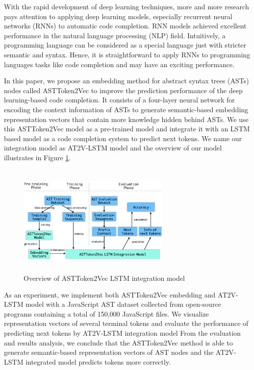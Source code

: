 \documentclass[T, E]{compsoft}
\begin{document}
With the rapid development of deep learning techniques, more and more research pays attention to applying deep learning models, especially recurrent neural networks (RNNs) to automatic code completion. 
RNN models achieved excellent performance in the natural language processing (NLP) field. 
Intuitively, a programming language can be considered as a special language just with stricter semantic and syntax. 
Hence, it is straightforward to apply RNNs to programming languages tasks like code completion and may have an exciting performance.

In this paper, we propose an embedding method for abstract syntax trees (ASTs) nodes called ASTToken2Vec to improve the prediction performance of the deep learning-based code completion. 
It consists of a four-layer neural network for encoding the context information of ASTs to generate semantic-based embedding representation vectors that contain more knowledge hidden behind ASTs. 
We use this ASTToken2Vec model as a pre-trained model and integrate it with an LSTM based model as a code completion system to predict next tokens. 
We name our integration model as AT2V-LSTM model and the overview of our model illustrates in Figure \ref{fig:overivew_model}.

\begin{figure}[!ht]
\centering
\includegraphics[width=7.5cm, height=5.5cm]{pictures/model_overview.png}
\caption{Overview of ASTToken2Vec LSTM integration model}
\label{fig:overivew_model}
\end{figure}

As an experiment, we implement both ASTToken2Vec embedding and AT2V-LSTM model with a JavaScript AST dataset\Cite{dataset} collected from open-source programs containing a total of 150,000 JavaScript files. 
We visualize representation vectors of several terminal tokens and evaluate the performance of predicting next tokens by AT2V-LSTM integration model
From the evaluation and results analysis, we conclude that the ASTToken2Vec method is able to generate semantic-based representation vectors of AST nodes and the AT2V-LSTM integrated model predicts tokens more correctly.
\end{document}
